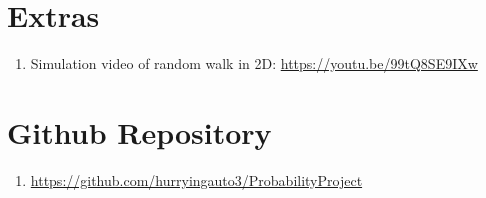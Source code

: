 \documentclass{article}
\begin{document}
\section{Extras}
\begin{enumerate}
    \item Simulation video of random walk in 2D: \url{https://youtu.be/99tQ8SE9IXw}
\end{enumerate}

\section{Github Repository}
\begin{enumerate}
    \item \url{https://github.com/hurryingauto3/ProbabilityProject}
\end{enumerate}
\end{document}
